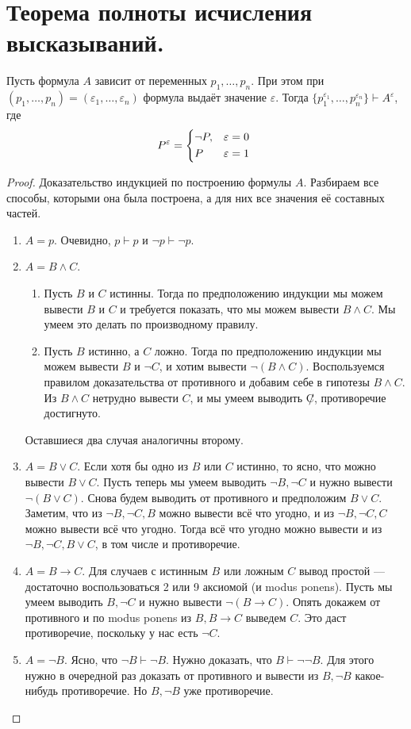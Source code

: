 \documentclass{article}
\begin{document}
\section{Теорема полноты исчисления высказываний.}
\begin{lemma}
	Пусть формула $A$ зависит от переменных $p_1, \ldots, p_n$. При этом при $(p_1, \ldots, p_n) = (\varepsilon_1, \ldots, \varepsilon_n)$ формула выдаёт значение $\varepsilon$. Тогда $\{p_1^{\varepsilon_1}, \ldots, p_n^{\varepsilon_n}\} \vdash A^{\varepsilon}$, где
\[P^\varepsilon = \begin{dcases*} \lnot P, & $\varepsilon = 0$ \\ P& $\varepsilon = 1$ \end{dcases*} \]
\end{lemma}

\begin{proof}
	Доказательство индукцией по построению формулы $A$. Разбираем все способы, которыми она была построена, а для них все значения её составных частей.
	\begin{enumerate}
		\item $A = p$. Очевидно, $p \vdash p$ и $\lnot p \vdash \lnot p$.
		\item $A = B \land C$. 
		\begin{enumerate}
			\item Пусть $B$ и $C$ истинны. Тогда по предположению индукции мы можем вывести $B$ и $C$ и требуется показать, что мы можем вывести $B \land C$. Мы умеем это делать по производному правилу.
			\item Пусть $B$ истинно, а $C$ ложно. Тогда по предположению индукции мы можем вывести $B$ и $\lnot C$, и хотим вывести $\lnot(B \land C)$. Воспользуемся правилом доказательства от противного и добавим себе в гипотезы $B \land C$. Из $B \land C$ нетрудно вывести $C$, и мы умеем выводить $\not C$, противоречие достигнуто.
		\end{enumerate}
		Оставшиеся два случая аналогичны второму.
		\item $A = B \lor C$. Если хотя бы одно из $B$ или $C$ истинно, то ясно, что можно вывести $B \lor C$. Пусть теперь мы умеем выводить $\lnot B, \lnot C$ и нужно вывести $\lnot (B \lor C)$. Снова будем выводить от противного и предположим $B \lor C$. Заметим, что из $\lnot B, \lnot C, B$ можно вывести всё что угодно, и из $\lnot B, \lnot C, C$ можно вывести всё что угодно. Тогда всё что угодно можно вывести и из $\lnot B, \lnot C, B \lor C$, в том числе и противоречие.
		\item $A = B \to C$. Для случаев с истинным $B$ или ложным $C$ вывод простой --- достаточно воспользоваться 2 или 9 аксиомой (и modus ponens). Пусть мы умеем выводить $B, \lnot C$ и нужно вывести $\lnot(B \to C)$. Опять докажем от противного и по modus ponens из $B, B \to C$ выведем $C$. Это даст противоречие, поскольку у нас есть $\lnot C$.
		\item $A = \lnot B$. Ясно, что $\lnot B \vdash \lnot B$. Нужно доказать, что $B \vdash \lnot \lnot B$. Для этого нужно в очередной раз доказать от противного и вывести из $B, \lnot B$ какое-нибудь противоречие. Но $B, \lnot B$ уже противоречие.
	\end{enumerate}
\end{proof}
\end{document}
